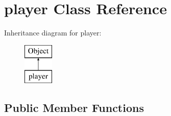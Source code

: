\hypertarget{classplayer}{\section{player \-Class \-Reference}
\label{classplayer}
}
\-Inheritance diagram for player\-:\begin{figure}[H]
\begin{center}
\leavevmode
\includegraphics[height=2.000000cm]{classplayer}
\end{center}
\end{figure}
\subsection*{\-Public \-Member \-Functions}

